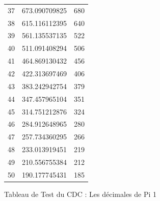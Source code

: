 \documentclass[10pt,a4paper]{article}
\begin{document}
\begin{figure}[h]
\begin{tabular}{|r|r|r|}
37 & 673.090709825 & 680\\
38 & 615.116112395 & 640\\
39 & 561.135537135 & 522\\
40 & 511.091408294 & 506\\
41 & 464.869130432 & 456\\
42 & 422.313697469 & 406\\
43 & 383.242942754 & 379\\
44 & 347.457965104 & 351\\
45 & 314.751212876 & 324\\
46 & 284.912648965 & 280\\
47 & 257.734360295 & 266\\
48 & 233.013919451 & 219\\
49 & 210.556755384 & 212\\
50 & 190.177745431 & 185\\
\hline
\end{tabular}
\caption{Tableau de Test du CDC : Les décimales de Pi 1}
\end{figure}
\end{document}
